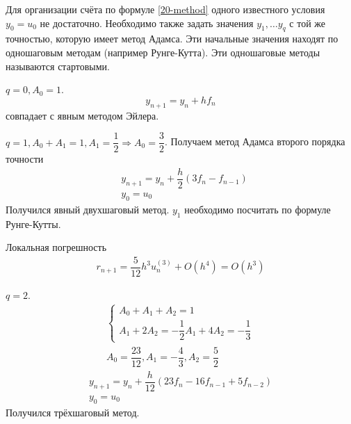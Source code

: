 Для организации счёта по формуле \eqref{20-method} одного известного условия
$y_0 = u_0$ не достаточно. Необходимо также задать значения $y_1, \ldots y_q$ с
той же точностью, которую имеет метод Адамса. Эти начальные значения находят
по одношаговым методам (например Рунге-Кутта). Эти одношаговые методы называются
стартовыми.

\begin{examples}
  \item $q = 0, A_0 = 1$.
  \begin{equation}
    y_{n + 1} = y_n + hf_n
  \end{equation}
  совпадает с явным методом Эйлера.
  \item $q = 1, A_0 + A_1 = 1, A_1 = \dfrac{1}{2} \Rightarrow A_0 = \dfrac{3}{2}$.
  Получаем метод Адамса второго порядка точности
  \begin{equation}
    \begin{split}
      &y_{n + 1} = y_n + \dfrac{h}{2}(3f_n - f_{n - 1})\\
      &y_0 = u_0
    \end{split}
  \end{equation}
  Получился явный двухшаговый метод. $y_1$ необходимо посчитать по формуле
  Рунге-Кутты.

  Локальная погрешность
  \begin{align*}
    r_{n + 1} = \dfrac{5}{12}h^3u_n^{(3)} + O(h^4) = O(h^3)
  \end{align*}

  \item $q = 2$.
  \begin{align*}
    \begin{cases}
      A_0 + A_1 + A_2 = 1\\
      A_1 + 2A_2 = -\dfrac{1}{2}
      A_1 + 4A_2 = -\dfrac{1}{3}
    \end{cases}\\
    A_0 = \dfrac{23}{12}, A_1 = -\dfrac{4}{3}, A_2 = \dfrac{5}{2}
  \end{align*}
  \begin{equation}
    \begin{split}
      y_{n + 1} = y_n + \dfrac{h}{12}(23f_n - 16f_{n - 1} + 5f_{n - 2})\\
      y_0 = u_0
    \end{split}
  \end{equation}
  Получился трёхшаговый метод.
\end{examples}

